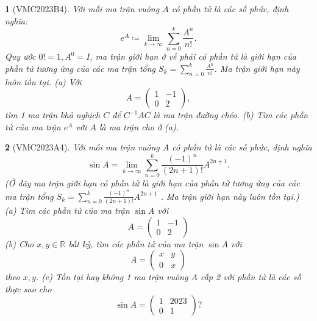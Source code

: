 \documentclass{article}
\newtheorem{baitoan}{}
\begin{document}
\begin{baitoan}[VMC2023B4]
	Với mỗi ma trận vuông $A$ có phần tử là các số phức, định nghĩa:
	\begin{equation*}
		e^A\coloneqq\lim_{k\to\infty} \sum_{n=0}^k \frac{A^n}{n!}.
	\end{equation*}
	Quy ước $0! = 1,A^0 = I$, ma trận giới hạn ở vế phải có phần tử là giới hạn của phần tử tương ứng của các ma trận tổng $S_k = \sum_{n=0}^k \frac{A^n}{n!}$. Ma trận giới hạn này luôn tồn tại. (a) Với
	\begin{equation*}
		A = \begin{pmatrix}
			1 & -1\\0 & 2
		\end{pmatrix},
	\end{equation*}
	tìm 1 ma trận khả nghịch $C$ để $C^{-1}AC$ là ma trận đường chéo. (b) Tìm các phần tử của ma trận $e^A$ với $A$ là ma trận cho ở (a).
\end{baitoan}

\begin{baitoan}[VMC2023A4]
	Với mỗi ma trận vuông $A$ có phần tử là các số phức, định nghĩa
	\begin{equation}
		\sin A = \lim_{k\to\infty} \sum_{n=0}^k \frac{(-1)^n}{(2n + 1)!}A^{2n + 1}.
	\end{equation}
	(Ở đây ma trận giới hạn có phần tử là giới hạn của phần tử tương ứng của các ma trận tổng $S_k = \sum_{n=0}^k \frac{(-1)^n}{(2n + 1)!}A^{2n + 1}$ . Ma trận giới hạn này luôn tồn tại.) (a) Tìm các phần tử của ma trận $\sin A$ với
	\begin{equation}
		A = \begin{pmatrix}
			1 & -1\\0 & 2
		\end{pmatrix}
	\end{equation}
	(b) Cho $x,y\in\mathbb{R}$ bất kỳ, tìm các phần tử của ma trận $\sin A$ với
	\begin{equation}
		A = \begin{pmatrix}
			x & y\\0 & x
		\end{pmatrix}
	\end{equation}
	theo $x,y$. (c) Tồn tại hay không 1 ma trận vuông $A$ cấp 2 với phần tử là các số thực sao cho
	\begin{equation}
		\sin A = \begin{pmatrix}
			1 & 2023\\0 & 1
		\end{pmatrix}?
	\end{equation}
\end{baitoan}
\end{document}
